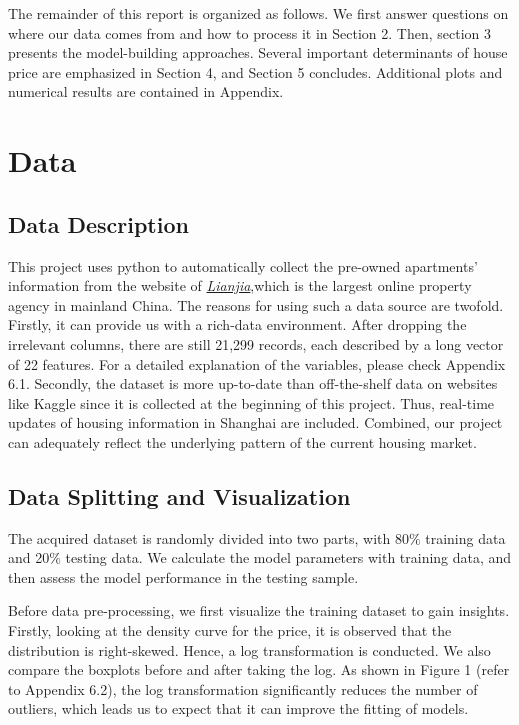 \documentclass[11pt,a4paper]{article}
\begin{document}
	The remainder of this report is organized as follows. We first answer questions on where our data comes from and how to process it in Section 2. Then, section 3 presents the model-building approaches. Several important determinants of house price are emphasized in Section 4, and Section 5 concludes. Additional plots and numerical results are contained in Appendix.

    \section{Data}
    \subsection{Data Description}
    This project uses python to automatically collect the pre-owned apartments' information from the website of \href{https://sh.lianjia.com/ershoufang}{\textit{Lianjia}},which is the largest online property agency in mainland China. The reasons for using such a data source are twofold. Firstly, it can provide us with a rich-data environment. After dropping the irrelevant columns, there are still 21,299 records, each described by a long vector of 22 features. For a detailed explanation of the variables, please check Appendix 6.1. Secondly, the dataset is more up-to-date than off-the-shelf data on websites like Kaggle since it is collected at the beginning of this project. Thus, real-time updates of housing information in Shanghai are included. Combined, our project can adequately reflect the underlying pattern of the current housing market.
    
    \subsection{Data Splitting and Visualization}
    The acquired dataset is randomly divided into two parts, with $80\%$ training data and 20$\%$ testing data. We calculate the model parameters with training data, and then assess the model performance in the testing sample. 
    
    Before data pre-processing, we first visualize the training dataset to gain insights. Firstly, looking at the density curve for the price, it is observed that the distribution is right-skewed. Hence, a log transformation is conducted. We also compare the boxplots before and after taking the log. As shown in Figure 1 (refer to Appendix 6.2), the log transformation significantly reduces the number of outliers, which leads us to expect that it can improve the fitting of models.
    
\end{document}
